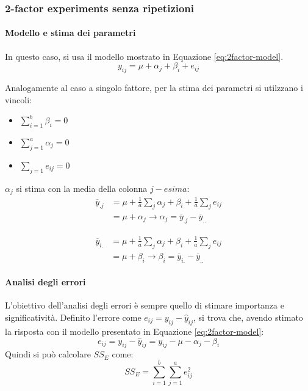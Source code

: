 \documentclass{article}
\begin{document}
\subsubsection{2-factor experiments senza ripetizioni}
\paragraph{Modello e stima dei parametri}
In questo caso, si usa il modello mostrato in Equazione \ref{eq:2factor-model}.
\begin{equation}
  y_{ij} = \mu + \alpha_j + \beta_i + e_{ij}
  \label{eq:2factor-model}
\end{equation}

Analogamente al caso a singolo fattore, per la stima dei parametri si utilzzano i vincoli:
\begin{itemize}
  \item $\sum_{i=1}^b\beta_i = 0$
  \item $\sum_{j=1}^a\alpha_j = 0$
  \item $\sum_{j=1} e_{ij} = 0$
\end{itemize}

$\alpha_j$ si stima con la media della colonna $j-esima$:
\begin{align}
  \overline{y}_{.j} &= \mu + \frac{1}{a} \sum_j\alpha_j + \beta_i + \frac{1}{a}\sum_{j}e_{ij}\\
  &= \mu + \alpha_j \to \alpha_j = \overline{y}_{.j} - \overline{y}_{..}
\end{align}

\begin{align}
  \overline{y}_{i.} &= \mu + \frac{1}{a} \sum_j\alpha_j + \beta_i + \frac{1}{a}\sum_{j}e_{ij}\\
  &= \mu + \beta_i \to \beta_i = \overline{y}_{i.} - \overline{y}_{..}
\end{align}

\paragraph{Analisi degli errori}
L'obiettivo dell'analisi degli errori è sempre quello di stimare importanza e significatività. 
Definito l'errore come $e_{ij} = y_{ij} -  \hat{y}_{ij}$, si trova che, avendo stimato la 
risposta con il modello presentato in Equazione \ref{eq:2factor-model}:
\[
  e_{ij} = y_{ij} - \hat{y}_{ij} = y_{ij} - \mu - \alpha_j - \beta_i
\]
Quindi si può calcolare $SS_E$ come:
\[
  SS_E = \sum_{i=1}^b\sum_{j=1}^a e_{ij}^2
\]
\end{document}
